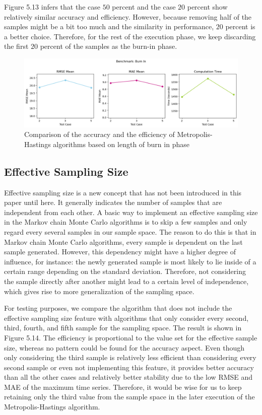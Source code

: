 Figure 5.13 infers that the case $50$ percent and the case $20$ percent show relatively similar accuracy and efficiency. However, because removing half of the samples might be a bit too much and the similarity in performance, $20$ percent is a better choice. Therefore, for the rest of the execution phase, we keep discarding the first $20$ percent of the samples as the burn-in phase.

\begin{figure}[H]
    \centering
    \includegraphics[width=1\textwidth]{figures/basic_mh/benchmark/burnin_factor.png}
    \captionsetup{width=.8\textwidth}
    \caption{Comparison of the accuracy and the efficiency of Metropolis-Hastings algorithms based on length of burn in phase}
    \label{fig:enter-label}
\end{figure}

\subsection{Effective Sampling Size}
Effective sampling size is a new concept that has not been introduced in this paper until here. It generally indicates the number of samples that are independent from each other. A basic way to implement an effective sampling size in the Markov chain Monte Carlo algorithms is to skip a few samples and only regard every several samples in our sample space. The reason to do this is that in Markov chain Monte Carlo algorithms, every sample is dependent on the last sample generated. However, this dependency might have a higher degree of influence, for instance: the newly generated sample is most likely to lie inside of a certain range depending on the standard deviation. Therefore, not considering the sample directly after another might lead to a certain level of independence, which gives rise to more generalization of the sampling space. 

For testing purposes, we compare the algorithm that does not include the effective sampling size feature with algorithms that only consider every second, third, fourth, and fifth sample for the sampling space. The result is shown in Figure 5.14. The efficiency is proportional to the value set for the effective sample size, whereas no pattern could be found for the accuracy aspect. Even though only considering the third sample is relatively less efficient than considering every second sample or even not implementing this feature, it provides better accuracy than all the other cases and relatively better stability due to the low RMSE and MAE of the maximum time series. Therefore, it would be wise for us to keep retaining only the third value from the sample space in the later execution of the Metropolis-Hastings algorithm.

